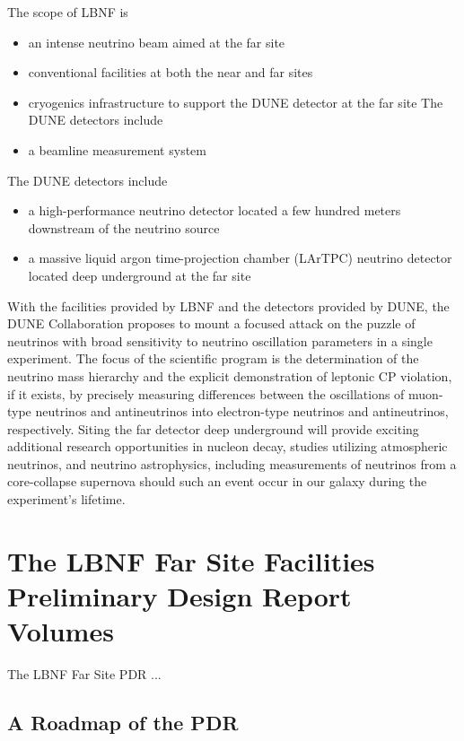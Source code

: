 The scope of LBNF is
\begin{itemize}
 \item an intense neutrino beam aimed at the far site
 \item conventional facilities at both the near and far sites
 \item cryogenics infrastructure to support the DUNE detector at the far site
The DUNE detectors include
 \item a beamline measurement system
\end{itemize}
The DUNE detectors include
\begin{itemize}
 \item a high-performance neutrino detector located a few hundred meters downstream of the neutrino source
 \item a massive liquid argon time-projection chamber (LArTPC) neutrino detector located deep underground at the far site
\end{itemize}


With the facilities provided by LBNF and the detectors provided by DUNE, the DUNE Collaboration proposes to mount a focused attack on the puzzle of neutrinos with broad sensitivity to neutrino oscillation parameters in a single experiment. The focus of the scientific program is the determination of the neutrino mass hierarchy and the explicit demonstration of leptonic CP violation, if it exists, by precisely measuring differences between the oscillations of muon-type neutrinos and antineutrinos into electron-type neutrinos and antineutrinos, respectively. Siting the far detector deep underground will provide exciting additional research opportunities in nucleon decay, studies utilizing atmospheric neutrinos, and neutrino astrophysics, including measurements of neutrinos from a core-collapse supernova should such an event occur in our galaxy during the experiment's lifetime.


\section{The LBNF Far Site Facilities Preliminary Design Report Volumes}
\label{sec:pdr-volumes}

The LBNF Far Site PDR ...


\subsection{A Roadmap of the PDR}
\label{sec:pdr-volumes-roadmap}

